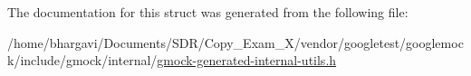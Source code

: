 The documentation for this struct was generated from the following file\+:\begin{DoxyCompactItemize}
\item 
/home/bhargavi/\+Documents/\+S\+D\+R/\+Copy\+\_\+\+Exam\+\_\+X/vendor/googletest/googlemock/include/gmock/internal/\hyperlink{gmock-generated-internal-utils_8h}{gmock-\/generated-\/internal-\/utils.\+h}\end{DoxyCompactItemize}
